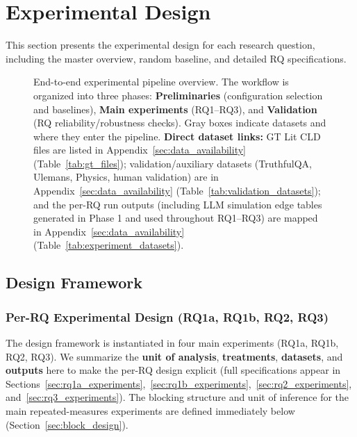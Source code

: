 \FloatBarrier
\clearpage
\section{Experimental Design}
\label{sec:experimental_design}

This section presents the experimental design for each research question, including the master overview, random baseline, and detailed RQ specifications.

\begin{figure}[H]
\centering
\resizebox{1.0\textwidth}{!}{%

}
\caption{End-to-end experimental pipeline overview. The workflow is organized into three phases: \textbf{Preliminaries} (configuration selection and baselines), \textbf{Main experiments} (RQ1--RQ3), and \textbf{Validation} (RQ reliability/robustness checks). Gray boxes indicate datasets and where they enter the pipeline. \textbf{Direct dataset links:} GT Lit CLD files are listed in Appendix~\ref{sec:data_availability} (Table~\ref{tab:gt_files}); validation/auxiliary datasets (TruthfulQA, Ulemans, Physics, human validation) are in Appendix~\ref{sec:data_availability} (Table~\ref{tab:validation_datasets}); and the per-RQ run outputs (including LLM simulation edge tables generated in Phase 1 and used throughout RQ1--RQ3) are mapped in Appendix~\ref{sec:data_availability} (Table~\ref{tab:experiment_datasets}).}
\label{fig:experimental_pipeline_overview}
\end{figure}

\subsection{Design Framework}

\subsubsection{Per-RQ Experimental Design (RQ1a, RQ1b, RQ2, RQ3)}
\label{sec:per_rq_design}

The design framework is instantiated in four main experiments (RQ1a, RQ1b, RQ2, RQ3). We summarize the \textbf{unit of analysis}, \textbf{treatments}, \textbf{datasets}, and \textbf{outputs} here to make the per-RQ design explicit (full specifications appear in Sections~\ref{sec:rq1a_experiments},~\ref{sec:rq1b_experiments},~\ref{sec:rq2_experiments}, and~\ref{sec:rq3_experiments}). The blocking structure and unit of inference for the main repeated-measures experiments are defined immediately below (Section~\ref{sec:block_design}).

